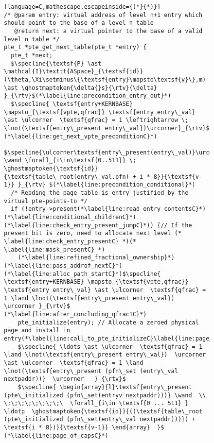 \begin{figure}\footnotesize
\ifPLDI
\begin{lstlisting}[language=C,mathescape,escapeinside={(*}{*)}]
/* @param entry: virtual address of level n+1 entry which should point to the base of a level n table
   @return next: a virtual pointer to the base of a valid level n table */
pte_t *pte_get_next_table(pte_t *entry) {
  pte_t *next;
  $\specline{\textsf{P} \ast \mathcal{I}\texttt{ASpace}_{\textsf{id}}(\theta,\Xi\setminus\{\textsf{entry}\mapsto\textsf{v}\},m) \ast \ghostmaptoken{\delta{}s}{\rtv}{\delta}  }_{\rtv}$(*\label{line:precondition_entry_out}*)
  $\specline{ \textsf{entry+KERNBASE} \mapsto_{\textsf{vpte,qfrac}} \textsf{entry entry\_val} \ast \ulcorner  \textsf{qfrac} = 1 \leftrightarrow \; \lnot(\textsf{entry\_present entry\_val})\urcorner}_{\rtv}$ (*\label{line:get_next_vpte_preconditionC}*)
  $\specline{\ulcorner\textsf{entry\_present(entry\_val)}\urcorner \wand \forall_{i\in\textsf{0..511}} \; \ghostmaptoken{\textsf{id}}{\textsf{table\_root(entry\_val.pfn) + i * 8}}{\textsf{v-1}} }_{\rtv} $(*\label{line:precondition_conditional}*) 
  /* Reading the page table is entry justified by the virtual pte-points-to */
  if (!entry->present(*\label{line:read_entry_contentsC}*)(*\label{line:conditional_childrenC}*)(*\label{line:check_entry_present_jumpC}*)) {// If the present bit is zero, need to allocate next level (* \label{line:check_entry_presentC} *)(* \label{line:mask_presentC} *) 
    (*\label{line:refined_fractional_ownership}*)(*\label{line:pass_addrof_nextC}*)(*\label{line:alloc_path_startC}*)$\specline{ \textsf{entry+KERNBASE} \mapsto_{\textsf{vpte,qfrac}} \textsf{entry entry\_val} \ast \ulcorner  \textsf{qfrac} = 1 \land \lnot(\textsf{entry\_present entry\_val})  \urcorner }_{\rtv}$ (*\label{line:after_concluding_qfrac1C}*)
    pte_initialize(entry); // Allocate a zeroed physical page and install in entry(*\label{line:call_to_pte_initializeC}\label{line:page_of_capsC}*)
    $\specline{ \ldots \ast \ulcorner  \textsf{qfrac} = 1 \land \lnot(\textsf{entry\_present entry\_val})  \urcorner \ast \ulcorner  \textsf{qfrac} = 1 \land \lnot(\textsf{entry\_present (pfn\_set (entry\_val nextpaddr))}  \urcorner   }_{\rtv}$
    $\specline{ \begin{array}{l}\textsf{entry\_present (pte\_initialized (pfn\_set(entryv nextpaddr)))} \wand  \\ \;\;\;\;\;\;\;\;\  \forall_{i\in \textsf{0 ... 511} } \ldotp  \ghostmaptoken{\textsf{id}}{((\textsf{table\_root (pte\_initialized (pfn\_set(entry\_val nextpaddr)))}) + \textsf{i * 8})}{\textsf{v-1}} \end{array}  }$ (*\label{line:page_of_capsC}*)

\end{lstlisting}
\end{figure}

